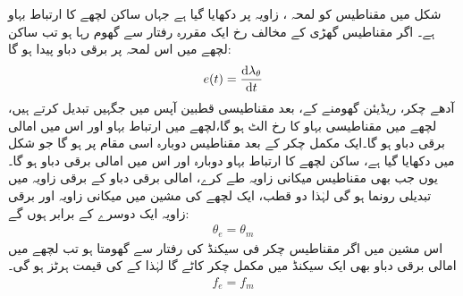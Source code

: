  شکل   میں مقناطیس کو لمحہ ،  زاویہ  پر دکھایا گیا ہے جہاں ساکن لچھے کا ارتباط بہاو  ہے۔ اگر مقناطیس گھڑی کے مخالف رخ ایک مقررہ رفتار  سے  گھوم رہا ہو تب ساکن لچھے میں اس لمحہ پر برقی دباو  پیدا ہو گا:
\begin{align}
e(t)=\frac{\dif \lambda_\theta}{\dif t}
\end{align}
آدھے چکر،  ریڈیئن  گھومنے کے،  بعد  مقناطیسی  قطبین آپس میں جگہیں تبدیل کرتے ہیں، لچھے میں مقناطیسی بہاو کا رخ الٹ ہو گا،لچھے میں ارتباط بہاو   اور اس میں امالی برقی دباو  ہو گا۔ایک مکمل چکر کے  بعد مقناطیس  دوبارہ اسی مقام پر ہو گا جو شکل  میں دکھایا گیا ہے، ساکن لچھے کا ارتباط بہاو دوبارہ  اور اس میں امالی برقی دباو  ہو گا۔ یوں جب بھی مقناطیس    میکانی زاویہ طے کرے،  امالی برقی دباو کے  برقی زاویہ میں   تبدیلی رونما ہو گی  لہٰذا دو قطب، ایک لچھے  کی مشین میں میکانی زاویہ  اور برقی زاویہ   ایک دوسرے کے برابر ہوں گے:
\begin{align*}
\theta_e=\theta_m
\end{align*}
اس مشین میں اگر مقناطیس  چکر فی سیکنڈ کی رفتار سے گھومتا ہو تب لچھے میں امالی برقی دباو  بھی ایک سیکنڈ میں  مکمل چکر کاٹے گا لہٰذا   کے     کی قیمت   ہرٹز ہو گی۔
\begin{align*}
f_e=f_m
\end{align*}
%
